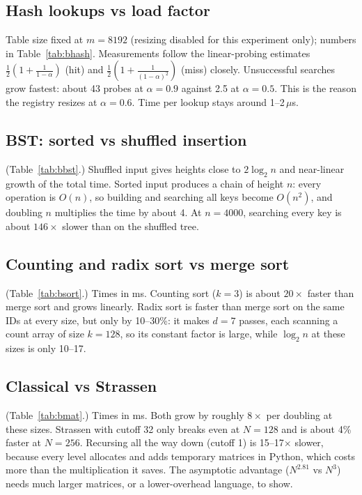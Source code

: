 \documentclass[11pt]{article}
\begin{document}
\subsection{Hash lookups vs load factor}
Table size fixed at $m = 8192$ (resizing disabled for this experiment only); numbers in Table~\ref{tab:bhash}.
Measurements follow the linear-probing estimates
$\frac12(1+\frac{1}{1-\alpha})$ (hit) and $\frac12(1+\frac{1}{(1-\alpha)^2})$
(miss) closely. Unsuccessful searches grow fastest: about 43 probes at
$\alpha = 0.9$ against 2.5 at $\alpha = 0.5$. This is the reason the registry
resizes at $\alpha = 0.6$. Time per lookup stays around 1--2\,$\mu$s.

\subsection{BST: sorted vs shuffled insertion}
(Table~\ref{tab:bbst}.)
Shuffled input gives heights close to $2\log_2 n$ and near-linear growth of the
total time. Sorted input produces a chain of height $n$: every operation is
$O(n)$, so building and searching all keys become $O(n^2)$, and doubling $n$
multiplies the time by about 4. At $n = 4000$, searching every key is about
$146\times$ slower than on the shuffled tree.

\subsection{Counting and radix sort vs merge sort}
(Table~\ref{tab:bsort}.)
Times in ms. Counting sort ($k = 3$) is about $20\times$ faster than merge sort
and grows linearly. Radix sort is faster than merge sort on the same IDs at
every size, but only by 10--30\%: it makes $d = 7$ passes, each scanning a
count array of size $k = 128$, so its constant factor is large, while
$\log_2 n$ at these sizes is only 10--17.

\subsection{Classical vs Strassen}
(Table~\ref{tab:bmat}.)
Times in ms. Both grow by roughly $8\times$ per doubling at these sizes.
Strassen with cutoff 32 only breaks even at $N = 128$ and is about 4\% faster
at $N = 256$. Recursing all the way down (cutoff 1) is 15--17$\times$ slower,
because every level allocates and adds temporary matrices in Python, which
costs more than the multiplication it saves. The asymptotic advantage
($N^{2.81}$ vs $N^3$) needs much larger matrices, or a lower-overhead
language, to show.
\end{document}
